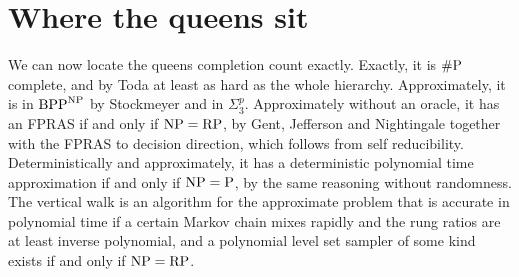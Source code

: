 \section{Where the queens sit}

We can now locate the queens completion count exactly. Exactly, it is $\#\mathrm{P}$ complete, and by Toda at least as hard as the whole hierarchy. Approximately, it is in $\mathrm{BPP}^{\mathrm{NP}}$ by Stockmeyer and in $\Sigma_3^p$. Approximately without an oracle, it has an FPRAS if and only if $\mathrm{NP} = \mathrm{RP}$, by Gent, Jefferson and Nightingale together with the FPRAS to decision direction, which follows from self reducibility. Deterministically and approximately, it has a deterministic polynomial time approximation if and only if $\mathrm{NP} = \mathrm{P}$, by the same reasoning without randomness. The vertical walk is an algorithm for the approximate problem that is accurate in polynomial time if a certain Markov chain mixes rapidly and the rung ratios are at least inverse polynomial, and a polynomial level set sampler of some kind exists if and only if $\mathrm{NP} = \mathrm{RP}$.
